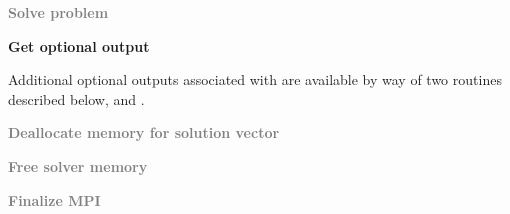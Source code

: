 \begin{Steps}
\item
  \textcolor{gray}{\bf Solve problem}

\item
  {\bf Get optional output}

  Additional optional outputs associated with {\kinbbdpre} are available by 
  way of two routines described below,
   and .

\item
  \textcolor{gray}{\bf Deallocate memory for solution vector}

\item
  \textcolor{gray}{\bf Free solver memory}
  
\item 
  \textcolor{gray}{\bf Finalize MPI}

\end{Steps}

